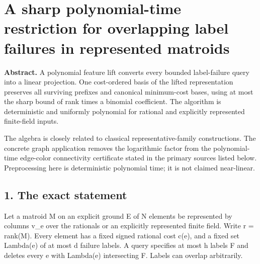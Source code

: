 
\hypertarget{af-7a1626f5ae-a-sharp-polynomial-time-restriction-for-overlapping-label-failures-in-represented-matroids}{%
\section{A sharp polynomial-time restriction for overlapping label failures in represented matroids}\label{af-7a1626f5ae-a-sharp-polynomial-time-restriction-for-overlapping-label-failures-in-represented-matroids}}

\textbf{Abstract.} A polynomial feature lift converts every bounded label-failure query into a linear projection. One cost-ordered basis of the lifted representation preserves all surviving prefixes and canonical minimum-cost bases, using at most the sharp bound of rank times a binomial coefficient. The algorithm is deterministic and uniformly polynomial for rational and explicitly represented finite-field inputs.

The algebra is closely related to classical representative-family constructions. The concrete graph application removes the logarithmic factor from the polynomial-time edge-color connectivity certificate stated in the primary sources listed below. Preprocessing here is deterministic polynomial time; it is not claimed near-linear.

\hypertarget{af-7a1626f5ae-the-exact-statement}{%
\subsection{1. The exact statement}\label{af-7a1626f5ae-the-exact-statement}}

Let a matroid M on an explicit ground E of N elements be represented by columns v\_e over the rationals or an explicitly represented finite field. Write r = rank(M). Every element has a fixed signed rational cost c(e), and a fixed set Lambda(e) of at most d failure labels. A query specifies at most h labels F and deletes every e with Lambda(e) intersecting F. Labels can overlap arbitrarily.

